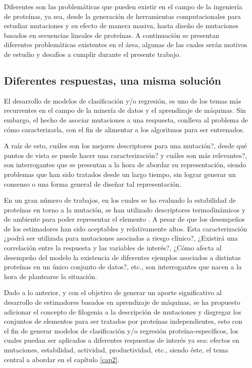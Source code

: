 Diferentes son las problemáticas que pueden existir en el campo de la ingeniería de proteínas, ya sea, desde la generación de herramientas computacionales para estudiar mutaciones y su efecto de manera masiva, hasta diseño de mutaciones basados en secuencias lineales de proteínas. A continuación se presentan diferentes problemáticas existentes en el área, algunas de las cuales serán motivos de estudio y desafíos a cumplir durante el presente trabajo.

\subsection{Diferentes respuestas, una misma solución}

El desarrollo de modelos de clasificación y/o regresión, es uno de los temas más recurrentes en el campo de la minería de datos y el aprendizaje de máquinas. Sin embargo, el hecho de asociar mutaciones a una respuesta, conlleva al problema de cómo caracterizarla, con el fin de alimentar a los algoritmos para ser entrenados. 

A raíz de esto, cuáles son los mejores descriptores para una mutación?, desde qué puntos de vista se puede hacer una caracterización? y cuáles son más relevantes?, son interrogantes que se presentan a la hora de abordar su representación, siendo problemas que han sido tratados desde un largo tiempo, sin lograr generar un consenso o una forma general de diseñar tal representación. 

En un gran número de trabajos, en los cuales se ha evaluado la estabilidad de proteínas en torno a la mutación, se han utilizado descriptores termodinámicos y de ambiente para poder representar el elemento \cite{capriotti2005mutant2, capriotti2008three}. A pesar de que los desempeños de los estimadores han sido aceptables y relativamente altos. Esta caracterización ¿podrá ser utilizada para mutaciones asociadas a riesgo clínico?, ¿Existirá una correlación entre la respuesta y las variables de interés?, ¿Cómo afecta al desempeño del modelo la existencia de diferentes ejemplos asociados a distintas proteínas en un único conjunto de datos?, etc., son interrogantes que nacen a la hora de plantearse la situación.

Dado a lo anterior, y con el objetivo de generar un aporte significativo al desarrollo de estimadores basados en aprendizaje de máquinas, se ha propuesto adicionar el concepto de filogenia a la descripción de mutaciones y disgregar los conjuntos de elementos para ser tratados por proteínas independientes, esto con el fin de generar modelos de clasificación y/o regresión proteína-específicos, los cuales puedan ser aplicados a diferentes respuestas de interés ya sea: efectos en mutaciones, estabilidad, actividad, productividad, etc., siendo éste, el tema central a abordar en el capítulo \ref{cap2}.
 
